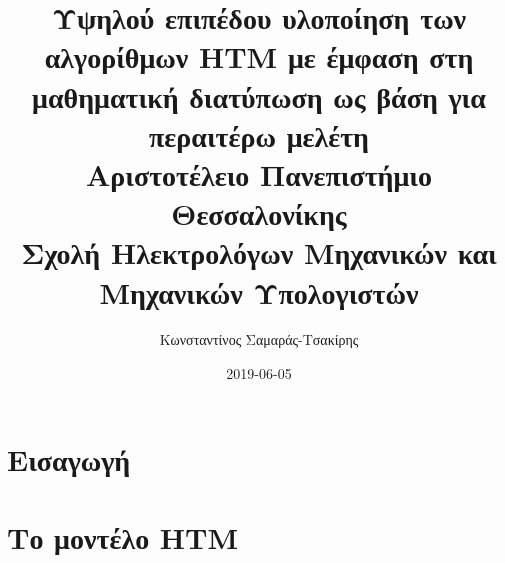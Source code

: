 \documentclass[a4paper,11pt,twoside]{report}
\title{
{Υψηλού επιπέδου υλοποίηση των αλγορίθμων HTM με έμφαση στη μαθηματική διατύπωση ως βάση για περαιτέρω μελέτη}\\
{\large Αριστοτέλειο Πανεπιστήμιο Θεσσαλονίκης}\\
{\large Σχολή Ηλεκτρολόγων Μηχανικών και Μηχανικών Υπολογιστών}
}
\author{Κωνσταντίνος Σαμαράς-Τσακίρης}
\date{2019-06-05}
\begin{document}
\maketitle
%

\tableofcontents{}

\chapter{Εισαγωγή}
%

\chapter{Το μοντέλο HTM}


\printbibliography
\appendix
\end{document}
